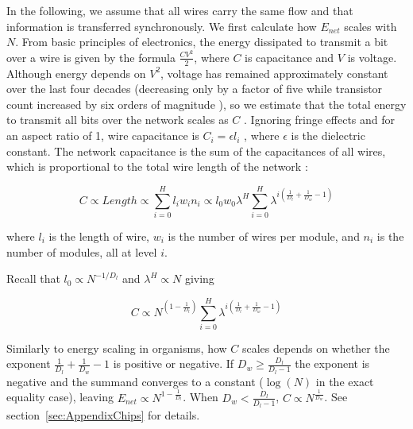 \documentclass[12pt]{article}
\begin{document}
In the following, we assume that all wires carry the same flow and that
information is transferred synchronously. We first calculate how $E_{net}$
scales with $N$. From basic principles of electronics, the energy dissipated to
transmit a bit over a wire is given by the formula $\frac{CV^2}{2}$, where $C$ is
capacitance and $V$ is voltage.  Although energy depends on $V^2$, voltage has
remained approximately constant over the last four decades (decreasing only by
a factor of five while transistor count increased by six orders of magnitude
\cite{ning07}), so we estimate that the total energy to transmit all bits over
the network scales as $C$ \cite{bingham08}.  Ignoring fringe effects and for an
aspect ratio of 1, wire capacitance is $C_i = \epsilon l_i$ \cite{wilhelm95},
where $\epsilon$ is the dielectric constant.  The network capacitance is the
sum of the capacitances of all wires, which is proportional to the total wire
length of the network \cite{donath79}:

\begin{equation}
C \propto Length \propto  \sum_{i=0}^H l_i w_i n_i \propto
 l_0 w_0 \lambda^H \sum_{i=0}^H \lambda^{i \left( 
\frac{1}{D_l} + \frac{1}{D_w} -1 \right)}
\end{equation}


\noindent where $l_i$ is the length of wire, $w_i$ is the number of wires per
module, and $n_i$ is the number of modules, all at level $i$.

Recall that $l_0 \propto N^{-1/D_l}$ and $\lambda^H \propto N$ giving 

\begin{equation}
  C \propto  N^{(1- \frac{1}{D_l})} \sum_{i=0}^H \lambda^{i \left( 
\frac{1}{D_l} + \frac{1}{D_w} -1 \right)}
\end{equation}


\noindent Similarly to energy scaling in organisms, how $C$ scales depends on whether the
exponent $\frac{1}{D_l} + \frac{1}{D_w}-1$ is positive or negative. If $D_w
\geq \frac{D_l}{D_l -1}$ the exponent is negative and the summand converges to
a constant ($\log(N)$ in the exact equality case), leaving $E_{net} \propto
N^{1-\frac{1}{D_l}}$. When $D_w < \frac{D_l}{D_l -1}$, $C \propto
N^{\frac{1}{D_w}}$. See section~\ref{sec:AppendixChips} for details.
\end{document}
